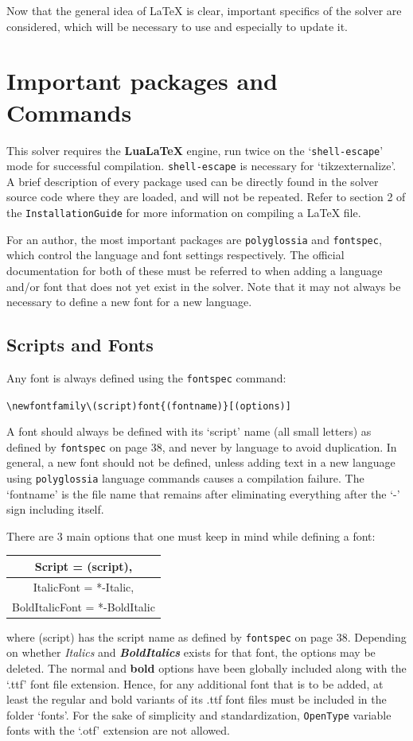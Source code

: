 \documentclass[12pt,twoside]{article}
\newcommand*{\bt}[1]{\textbf{#1}}
\newenvironment{syntax}{\def\FrameCommand{\colorbox{ruler}} \MakeFramed{\advance\hsize+\width}\begin{center}}{\end{center}\endMakeFramed}
\newenvironment{setdef}{\def\FrameCommand{\colorbox{mathset}} \MakeFramed{\advance\hsize+\width}\begin{center}}{\end{center}\endMakeFramed}
\begin{document}
Now that the general idea of \LaTeX{} is clear,  important specifics of the solver are considered, which will be necessary to  use and especially to update it.
\section{Important packages and Commands} \label{sec:enstruc}
This solver requires the \bt{LuaLaTeX} engine, run twice on the `\texttt{shell-escape}' mode for successful compilation. \texttt{shell-escape} is necessary for `tikzexternalize'. A brief description of every package used can be directly found in the solver source code where they are loaded, and will not be repeated. Refer to section 2 of the \texttt{InstallationGuide} for more information on compiling a \LaTeX{} file.

For an author, the most important packages are \texttt{polyglossia} and \texttt{fontspec}, which control the language and font settings respectively. The official documentation for both of these must be referred to when adding a language and/or font that does not yet exist in the solver. Note that it may not always be necessary to define a new font for a new language.
\subsection{Scripts and Fonts} \label{sec:enfont}
Any font is always defined using the \texttt{fontspec} command:
\begin{syntax}
 \verb|\newfontfamily\(script)font{(fontname)}[(options)]|
\end{syntax}
A font should always be defined with its `script' name (all small letters) as defined by \texttt{fontspec} on page 38, and never by language to avoid duplication. In general, a new font should not be defined, unless adding text in a new language using \texttt{polyglossia} language commands causes a compilation failure. The `fontname' is the file name that remains after eliminating everything after the `-' sign including itself.

There are $3$ main options that one must keep in mind while defining a font:
\begin{setdef}
\begin{tabular}{c}
Script = (script),\\\hline ItalicFont = *-Italic,\\\hline BoldItalicFont = *-BoldItalic
\end{tabular}
\end{setdef}
where (script) has the script name as defined by \texttt{fontspec} on page 38. Depending on whether \textit{Italics} and \bt{\textit{BoldItalics}} exists for that font, the options may be deleted. The normal and \bt{bold} options have been globally included along with the `.ttf' font file extension. Hence, for any additional font that is to be added, at least the regular and bold variants of its .ttf font files must be included in the folder `fonts'. For the sake of simplicity and standardization, \texttt{OpenType} variable fonts with the `.otf' extension are not allowed.
\end{document}
